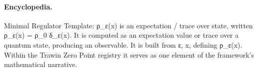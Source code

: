 \paragraph{Encyclopedia.}
Minimal Regulator Template: ρ\_ε(x) is an expectation / trace over state, written ρ\_ε(x) = ρ\_0 δ\_ε(x). It is computed as an expectation value or trace over a quantum state, producing an observable. It is built from ε, x, defining ρ\_ε(x). Within the Trawin Zero Point registry it serves as one element of the framework's mathematical narrative.
